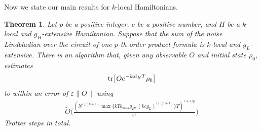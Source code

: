 \documentclass[11pt]{article}
\newtheorem{theorem}{Theorem}
\renewcommand{\i}{\mathrm{i}}
\newcommand{\ad}{\mathrm{ad}}
\newcommand{\eps}{\varepsilon}
\begin{document}
Now we state our main results for  $k$-local Hamiltonians.  
\begin{theorem}
\label{thm:local-ham}
    Let $p$ be a positive integer, $c$ be a positive number, and $H$ be a $k$-local and $g_H$-extensive Hamiltonian. Suppose that the sum of the noise Lindbladian over the circuit of one $p$-th order product formula is $k$-local and $g_L$-extensive. There is an algorithm that, given any observable $O$ and initial state $\rho_0$,  estimates \begin{align*}
        \tr[O e^{-\i \ad_H T}\rho_0]
    \end{align*}
    to within an error of $\eps\|O\|$ using \begin{align*}
    \widetilde{O}\Big(\frac{( N^{1/(p+1)}\max\{k\Upsilon a_{\max}g_H, (kcg_L)^{1/(p+1)}\}T)^{1+1/p}}{\eps^2}\Big)
    \end{align*}
    Trotter steps in total. 
\end{theorem}
\end{document}

